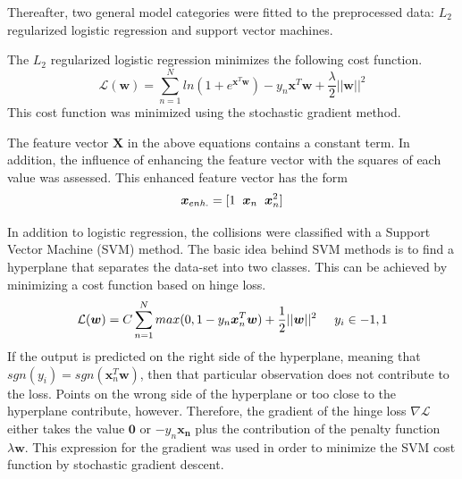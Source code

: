 \documentclass[10pt,conference,compsocconf]{IEEEtran}
\begin{document}
\par
Thereafter, two general model categories were fitted to the preprocessed data: $L_2$ regularized logistic regression and support vector machines.  
\par
The $L_2$ regularized logistic regression minimizes the following cost function.
\begin{equation}
\mathcal{L}(\boldsymbol{w}) = \sum_{n=1}^N ln(1+e^{\boldsymbol{x}^T\boldsymbol{w}}) - y_n \boldsymbol{x}^T\boldsymbol{w} + \frac{\lambda}{2}||\boldsymbol{w}||^2
\end{equation}
This cost function was minimized using the stochastic gradient method. \par
The feature vector $\boldsymbol{X}$ in the above equations contains a constant term. In addition, the influence of enhancing the feature vector with the squares of each value was assessed. This enhanced feature vector has the form
\begin{equation}
\boldsymbol{x}_{enh.} = [1 \hspace{2mm} \boldsymbol{x}_n \hspace{2mm} \boldsymbol{x}_n^2]
\end{equation}
\par
In addition to logistic regression, the collisions were classified with a Support Vector Machine (SVM) method. The basic idea behind SVM methods is to find a hyperplane that separates the data-set into two classes. This can be achieved by minimizing a cost function based on hinge loss.
\begin{equation}
\mathcal{L}(\boldsymbol{w}) = C \sum_{n=1}^N max(0,1-y_n \boldsymbol{x}_n^T\boldsymbol{w}) + \frac{1}{2}||\boldsymbol{w}||^2 \hspace{5mm} y_i \in {-1,1}
\end{equation}  
If the output is predicted on the right side of the hyperplane, meaning that $sgn(y_i) = sgn(\boldsymbol{x}_n^T\boldsymbol{w})$, then that particular observation does not contribute to the loss. Points on the wrong side of the hyperplane or too close to the hyperplane contribute, however. Therefore, the gradient of the hinge loss $\nabla \mathcal{L}$ either takes the value $\boldsymbol{0}$ or $-y_n\boldsymbol{x_n}$ plus the contribution of the penalty function $\lambda \boldsymbol{w}$. This expression for the gradient was used in order to minimize the SVM cost function by stochastic gradient descent.
\end{document}
